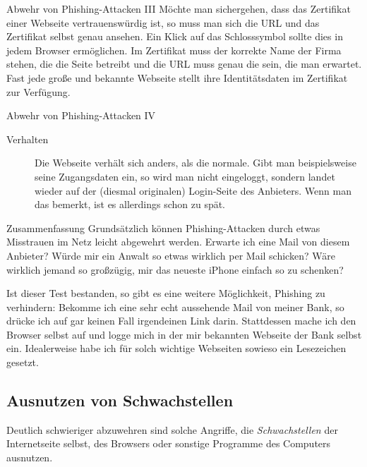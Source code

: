 \documentclass[utf8]{beamer}
\begin{document}
	\begin{frame}{Abwehr von Phishing-Attacken III}
		Möchte man sichergehen, dass das Zertifikat einer Webseite vertrauenswürdig ist, so muss man sich die URL und das Zertifikat selbst genau ansehen. Ein Klick auf das Schlosssymbol sollte dies in jedem Browser ermöglichen.
		Im Zertifikat muss der korrekte Name der Firma stehen, die die Seite betreibt und die URL muss genau die sein, die man erwartet. Fast jede große und bekannte Webseite stellt ihre Identitätsdaten im Zertifikat zur Verfügung.
	\end{frame}
	
	\begin{frame}{Abwehr von Phishing-Attacken IV}
		\begin{description}
			\item[Verhalten] {Die Webseite verhält sich anders, als die normale. Gibt man beispielsweise seine Zugangsdaten ein, so wird man nicht eingeloggt, sondern landet wieder auf der (diesmal originalen) Login-Seite des Anbieters. Wenn man das bemerkt, ist es allerdings schon zu spät.}
		\end{description}
	\end{frame}
	
	\begin{frame}{Zusammenfassung}
		Grundsätzlich können Phishing-Attacken durch etwas Misstrauen im Netz leicht abgewehrt werden. Erwarte ich eine Mail von diesem Anbieter? Würde mir ein Anwalt so etwas wirklich per Mail schicken? Wäre wirklich jemand so großzügig, mir das neueste iPhone einfach so zu schenken?
		
		Ist dieser Test bestanden, so gibt es eine weitere Möglichkeit, Phishing zu verhindern: Bekomme ich eine sehr echt aussehende Mail von meiner Bank, so drücke ich auf gar keinen Fall irgendeinen Link darin. Stattdessen mache ich den Browser selbst auf und logge mich in der mir bekannten Webseite der Bank selbst ein. Idealerweise habe ich für solch wichtige Webseiten sowieso ein Lesezeichen gesetzt.
	\end{frame}
	
	\subsection{Ausnutzen von Schwachstellen}
	\begin{frame}
		Deutlich schwieriger abzuwehren sind solche Angriffe, die \emph{Schwachstellen} der Internetseite selbst, des Browsers oder sonstige Programme des Computers ausnutzen.
	\end{frame}
\end{document}
